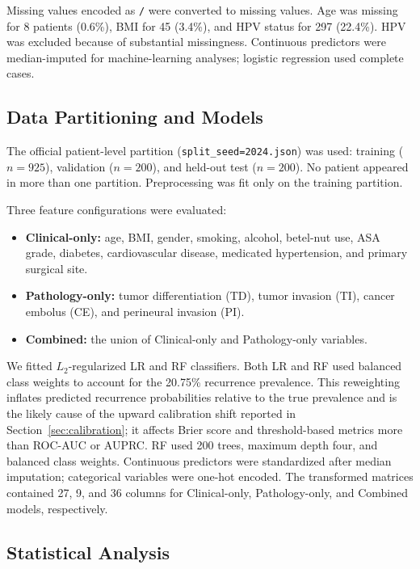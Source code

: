 \documentclass[11pt,a4paper]{article}
\begin{document}
Missing values encoded as \texttt{/} were converted to missing values. Age was missing for 8 patients (0.6\%), BMI for 45 (3.4\%), and HPV status for 297 (22.4\%). HPV was excluded because of substantial missingness. Continuous predictors were median-imputed for machine-learning analyses; logistic regression used complete cases.

\subsection{Data Partitioning and Models}

The official patient-level partition (\texttt{split\_seed=2024.json}) was used: training ($n=925$), validation ($n=200$), and held-out test ($n=200$). No patient appeared in more than one partition. Preprocessing was fit only on the training partition.

Three feature configurations were evaluated:

\begin{itemize}

    \item \textbf{Clinical-only:} age, BMI, gender, smoking, alcohol, betel-nut use, ASA grade, diabetes, cardiovascular disease, medicated hypertension, and primary surgical site.

    \item \textbf{Pathology-only:} tumor differentiation (TD), tumor invasion (TI), cancer embolus (CE), and perineural invasion (PI).

    \item \textbf{Combined:} the union of Clinical-only and Pathology-only variables.

\end{itemize}

We fitted $L_2$-regularized LR and RF classifiers. Both LR and RF used balanced class weights to account for the 20.75\% recurrence prevalence. This reweighting inflates predicted recurrence probabilities relative to the true prevalence and is the likely cause of the upward calibration shift reported in Section~\ref{sec:calibration}; it affects Brier score and threshold-based metrics more than ROC-AUC or AUPRC. RF used 200 trees, maximum depth four, and balanced class weights. Continuous predictors were standardized after median imputation; categorical variables were one-hot encoded. The transformed matrices contained 27, 9, and 36 columns for Clinical-only, Pathology-only, and Combined models, respectively.

\subsection{Statistical Analysis}
\end{document}
